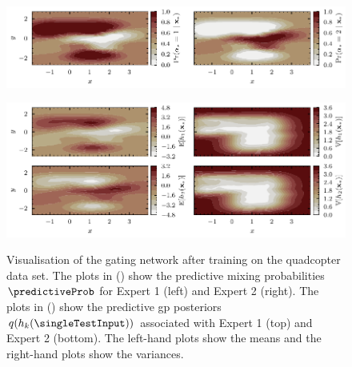 \documentclass{mimosis-class/mimosis}
\numberwithin{equation}{chapter}
\newcommand{\modeInd}{\ensuremath{k}}
\newcommand{\ModeInd}{\ensuremath{\MakeUppercase{\modeInd}}}
\begin{document}
{\begin{figure}[t1]
\centering
\begin{minipage}[r]{1.0\textwidth}
\centering
\includegraphics[width=\textwidth]{./images/model/quadcopter/subset-10/gating_mixing_probs.pdf}
\label{fig-gating-mixing-probs-quadcopter-subset}
\end{minipage}
\begin{minipage}[r]{1.0\textwidth}
\includegraphics[width=\textwidth]{./images/model/quadcopter/subset-10/gating_gps.pdf}
\label{fig-gating-gps-quadcopter-subset}
\end{minipage}
\caption[\acrshort{mosvgpe}'s gating network posterior with $\ModeInd=2$ after training on the real-world quadcopter data set with $\furtherBound$]{Visualisation of the gating network after training on the quadcopter data set. The plots in () show the predictive mixing probabilities $\predictiveProb$ for Expert 1 (left) and Expert 2 (right). The plots in () show the predictive \acrshort{gp} posteriors $q(h_{k}(\singleTestInput))$ associated with Expert 1 (top) and Expert 2 (bottom). The left-hand plots show the means and the right-hand plots show the variances.}
\label{fig-gating-network-quadcopter-subset}
\end{figure}

}
\end{document}

